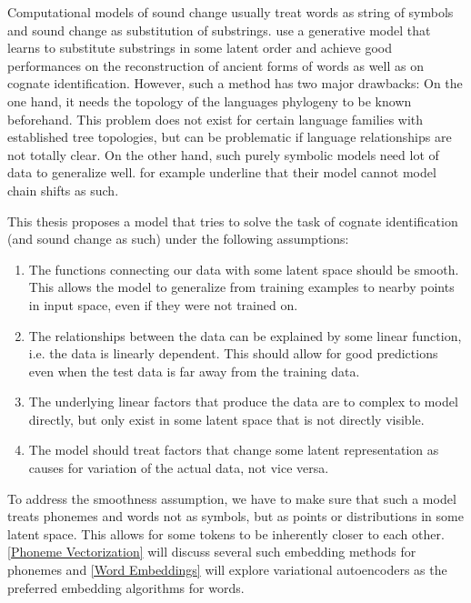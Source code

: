 \documentclass[6pt]{article}
\begin{document}
Computational models of sound change usually treat words as string of symbols and sound change as substitution of substrings.\cite{bouchard2007probabilistic,bouchard2013automated} use a generative model that learns to substitute substrings in some latent order and achieve good performances on the reconstruction of ancient forms of words as well as on cognate identification. However, such a method has two major drawbacks: On the one hand, it needs the topology of the languages phylogeny to be known beforehand. This problem does not exist for certain language families with established tree topologies, but can be problematic if language relationships are not totally clear. On the other hand, such purely symbolic models need lot of data to generalize well. \cite{bouchard2007probabilistic} for example underline that their model cannot model chain shifts as such.

This thesis proposes a model that tries to solve the task of cognate identification (and sound change as such) under the following assumptions:
\begin{enumerate}
\item The functions connecting our data with some latent space should be smooth. This allows the model to generalize from training examples to nearby points in input space, even if they were not trained on.
\item The relationships between the data can be explained by some linear function, i.e. the data is linearly dependent. This should allow for good predictions even when the test data is far away from the training data.
\item The underlying linear factors that produce the data are to complex to model directly, but only exist in some latent space that is not directly visible. 
\item The model should treat factors that change some latent representation as causes for variation of the actual data, not vice versa.
\end{enumerate}

To address the smoothness assumption, we have to make sure that such a model treats phonemes and words not as symbols, but as points or distributions in some latent space. This allows for some tokens to be inherently closer to each other. \ref{Phoneme Vectorization} will discuss several such embedding methods for phonemes and \ref{Word Embeddings} will explore variational autoencoders as the preferred embedding algorithms for words.  
\end{document}
